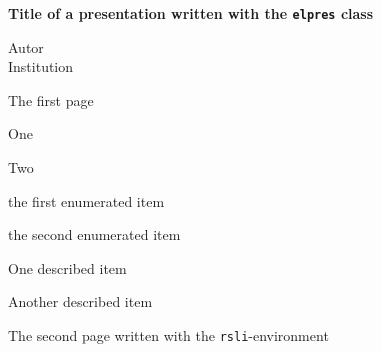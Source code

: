 \documentclass[pdftex,12pt,helvetfont]{elpres}
\begin{document}
\begin{titlepage}
\centering \LARGE
 \bfseries \textcolor{blau}{Title of a presentation written with the 
    \texttt{elpres} class}

\large
Autor\\[1ex]\textcolor{hellgrau}{Institution}
\end{titlepage}

\begin{psli}
\textcolor{rot}{The first page}

\begin{citemize}
  \item One
  \item Two
\end{citemize}

\begin{cenumerate}
  \item the first enumerated item
  \item the second enumerated item
\end{cenumerate}

\begin{cdescription}
  \item [One] described item
  \item [Another] described item
\end{cdescription}

\end{psli}

\begin{rsli}
The second page written with the \texttt{rsli}-environment
\end{rsli}
\end{document}

